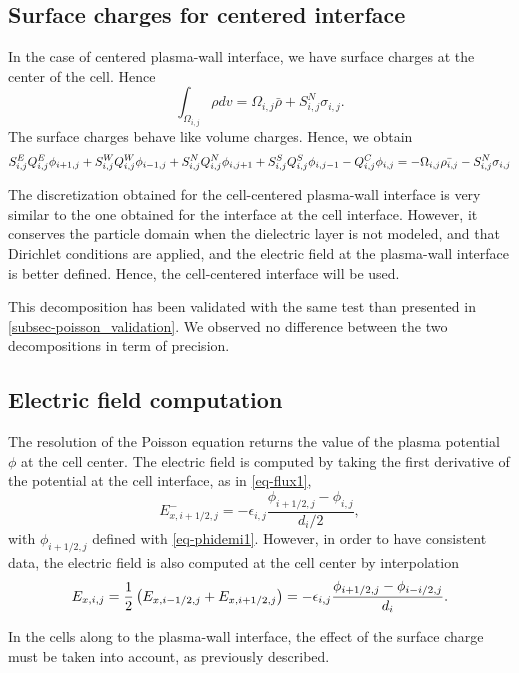   \subsection{Surface charges for centered interface}
    In the case of centered plasma-wall interface, we have surface charges at the center of the cell.
    Hence
    \begin{equation}
    \int_{\Omega_{i,j}} \rho dv = \Omega_{i,j}\bar{\rho} + S_{i,j}^N \sigma_{i,j}.
    \end{equation}
    The surface charges behave like volume charges.
    Hence, we obtain
    \begin{equation}
    S^E_{i,j} Q^E_{i,j} \phi_{i+1,j} + S^W_{i,j} Q^W_{i,j} \phi_{i-1,j} + S^N_{i,j} Q^N_{i,j} \phi_{i,j+1} + S^S_{i,j} Q^S_{i,j} \phi_{i,j-1} - Q^C_{i,j} \phi_{i,j} = - \Omega_{i,j} \bar{\rho_{i,j}} - S^N_{i,j} \sigma_{i,j}
    \end{equation}

    The discretization obtained for the cell-centered plasma-wall interface  is very similar to the one obtained for the interface at the cell interface.
    However, it conserves the particle domain when the dielectric layer is not modeled, and that Dirichlet conditions are applied, and the electric field at the plasma-wall interface is better defined.
    Hence, the cell-centered interface will be used.

    \vspace{1em}
    This decomposition has been validated with the same test than presented in \cref{subsec-poisson_validation}.
    We observed no difference between the two decompositions in term of precision.
    
    
  \subsection{Electric field computation}
  
    The resolution of the Poisson equation returns the value of the plasma potential $\phi$ at the cell center.
    The electric field is computed by taking the first derivative of the potential at the cell interface, as in \cref{eq-flux1},
    \begin{equation} \label{eq-E_ihalf}
      E_{x, i+1/2,j}^- = - \epsilon_{i,j} \frac{\phi_{i+1/2,j} - \phi_{i,j}}{d_i/2},
    \end{equation}
    with $\phi_{i+1/2,j}$ defined with \cref{eq-phidemi1}.
    However, in order to have consistent data, the electric field is also computed at the cell center by interpolation
    \begin{equation} \label{eq-E_mean}
      E_{x, i, j} = \frac{1}{2} \left( E_{x, i-1/2,j} + E_{x, i+1/2,j} \right) =  - \epsilon_{i,j} \frac{\phi_{i+1/2,j} - \phi_{i-i/2,j}}{d_i}.
    \end{equation}
    
    In the cells along to the plasma-wall interface, the effect of the surface charge must be taken into account, as previously described.
    
  
  